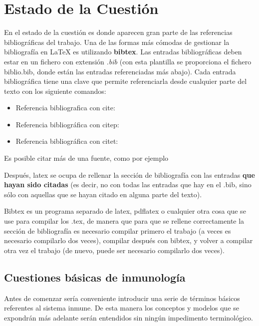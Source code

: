 \chapter{Estado de la Cuestión}
\label{cap:estadoDeLaCuestion}

En el estado de la cuestión es donde aparecen gran parte de las referencias bibliográficas del trabajo. Una de las formas más cómodas de gestionar la bibliografía en {\LaTeX} es utilizando \textbf{bibtex}. Las entradas bibliográficas deben estar en un fichero con extensión \textit{.bib} (con esta plantilla se proporciona el fichero biblio.bib, donde están las entradas referenciadas más abajo). Cada entrada bibliográfica tiene una clave que permite referenciarla desde cualquier parte del texto con los siguiente comandos:

\begin{itemize}
\item Referencia bibliografica con cite: \cite{ldesc2e}
\item Referencia bibliográfica con citep: \citep{notsoshort}
\item Referencia bibliográfica con citet: \citet{latexAPrimer}
\end{itemize}

Es posible citar más de una fuente, como por ejemplo \citep{latexCompanion,LaTeXLamport,texKnuth}

Después, latex se ocupa de rellenar la sección de bibliografía con las entradas \textbf{que hayan sido citadas} (es decir, no con todas las entradas que hay en el .bib, sino sólo con aquellas que se hayan citado en alguna parte del texto).

Bibtex es un programa separado de latex, pdflatex o cualquier otra cosa que se use para compilar los .tex, de manera que para que se rellene correctamente la sección de bibliografía es necesario compilar primero el trabajo (a veces es necesario compilarlo dos veces), compilar después con bibtex, y volver a compilar otra vez el trabajo (de nuevo, puede ser necesario compilarlo dos veces). 


\section{Cuestiones básicas de inmunología}

Antes de comenzar sería conveniente introducir una serie de términos básicos referentes al sistema inmune. De esta manera los conceptos y modelos que se expondrán más adelante serán entendidos sin ningún impedimento terminológico. 

